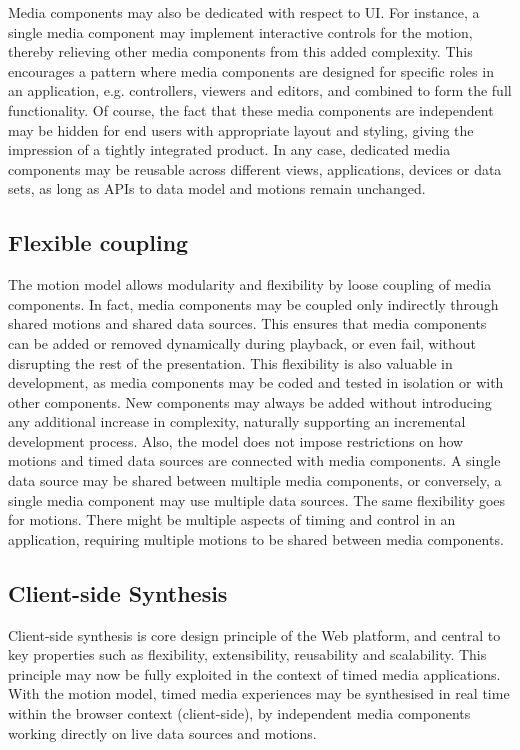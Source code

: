 Media components may also be dedicated with respect to UI. For instance, a
single media component may implement interactive controls for the motion,
thereby relieving other media components from this added complexity. This
encourages a pattern where media components are designed for specific roles in
an application, e.g. controllers, viewers and editors, and combined to form
the full functionality. Of course, the fact that these media components are
independent may be hidden for end users with appropriate layout and styling,
giving the impression of a tightly integrated product. In any case, dedicated
media components may be reusable across different views, applications, devices
or data sets, as long as APIs to data model and motions remain unchanged.

\subsection{Flexible coupling}

The motion model allows modularity and flexibility by loose coupling of media
components. In fact, media components may be coupled only indirectly through
shared motions and shared data sources. This ensures that media components can
be added or removed dynamically during playback, or even fail, without
disrupting the rest of the presentation. This flexibility is also valuable in
development, as media components may be coded and tested in isolation or with
other components. New components may always be added without introducing any
additional increase in complexity, naturally supporting an incremental
development process. Also, the model does not impose restrictions on how
motions and timed data sources are connected with media components. A single
data source may be shared between multiple media components, or conversely, a
single media component may use multiple data sources. The same flexibility
goes for motions. There might be multiple aspects of timing and control in an
application, requiring multiple motions to be shared between media components.


\subsection{Client-side Synthesis}

Client-side synthesis is core design principle of the Web platform, and
central to key properties such as flexibility, extensibility, reusability and
scalability. This principle may now be fully exploited in the context of timed
media applications. With the motion model, timed media experiences
may be synthesised in real time within the browser context (client-side), by
independent media components working directly on live data sources and
motions.

